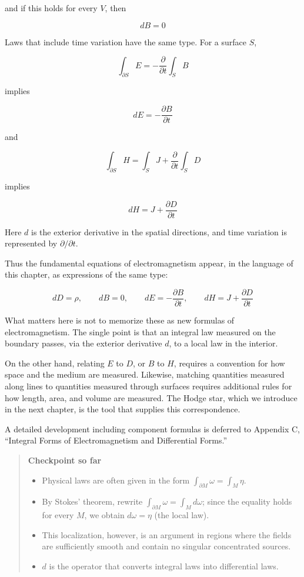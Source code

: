 and if this holds for every \(V\), then

\[
dB=0
\]

Laws that include time variation have the same type. For a surface
\(S\),

\[
\int_{\partial S}E
=
-\frac{\partial}{\partial t}\int_S B
\]

implies

\[
dE=-\frac{\partial B}{\partial t}
\]

and

\[
\int_{\partial S}H
=
\int_S J+\frac{\partial}{\partial t}\int_S D
\]

implies

\[
dH=J+\frac{\partial D}{\partial t}
\]

Here \(d\) is the exterior derivative in the spatial directions, and
time variation is represented by \(\partial/\partial t\).

Thus the fundamental equations of electromagnetism appear, in the
language of this chapter, as expressions of the same type:

\[
dD=\rho,\qquad
dB=0,\qquad
dE=-\frac{\partial B}{\partial t},\qquad
dH=J+\frac{\partial D}{\partial t}
\]

What matters here is not to memorize these as new formulas of
electromagnetism. The single point is that an integral law measured on
the boundary passes, via the exterior derivative \(d\), to a local law
in the interior.

On the other hand, relating \(E\) to \(D\), or \(B\) to \(H\), requires
a convention for how space and the medium are measured. Likewise,
matching quantities measured along lines to quantities measured through
surfaces requires additional rules for how length, area, and volume are
measured. The Hodge star, which we introduce in the next chapter, is the
tool that supplies this correspondence.

A detailed development including component formulas is deferred to
Appendix C, ``Integral Forms of Electromagnetism and Differential
Forms.''

\begin{quote}
\textbf{Checkpoint so far}

\begin{itemize}
\item
  Physical laws are often given in the form
  \(\int_{\partial M} \omega = \int_M \eta\).
\item
  By Stokes' theorem, rewrite
  \(\int_{\partial M} \omega = \int_M d\omega\); since the equality
  holds for every \(M\), we obtain \(d\omega = \eta\) (the local law).
\item
  This localization, however, is an argument in regions where the fields
  are sufficiently smooth and contain no singular concentrated sources.
\item
  \(d\) is the operator that converts integral laws into differential
  laws.
\end{itemize}
\end{quote}

